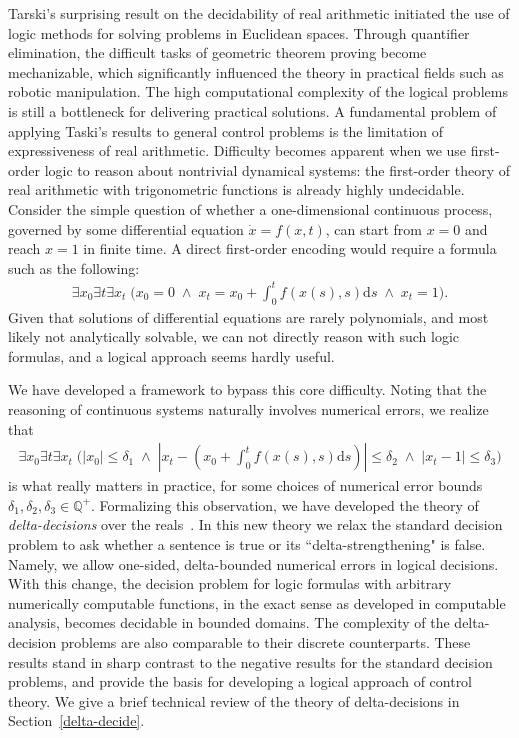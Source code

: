 \documentclass[11pt]{article}
\theoremstyle{definition}
\begin{document}
Tarski's surprising result on the decidability of real arithmetic initiated the use of logic methods for solving problems in Euclidean spaces. Through quantifier elimination, the difficult tasks of geometric theorem proving become mechanizable, which significantly influenced the theory in practical fields such as robotic manipulation. The high computational complexity of the logical problems is still a bottleneck for delivering practical solutions. A fundamental problem of applying Taski's results to general control problems is the limitation of expressiveness of real arithmetic. Difficulty becomes apparent when we use first-order logic to reason about nontrivial dynamical systems: the first-order theory of real arithmetic with trigonometric functions is already highly undecidable. Consider the simple question of whether a one-dimensional continuous process, governed by some differential equation $\dot{x} = f(x,t)$, can start from $x=0$ and reach $x=1$ in finite time. A direct first-order encoding would require a formula such as the following:
\begin{eqnarray*}
\exists x_0 \exists t \exists x_t\; \bigg(x_0 = 0 \;\wedge\; x_t = x_0 + \int_{0}^t f(x(s),s)\mathrm{d}s\; \wedge\; x_t = 1\bigg).
\end{eqnarray*}
Given that solutions of differential equations are rarely polynomials, and most likely not analytically solvable, we can not directly reason with such logic formulas, and a logical approach seems hardly useful. 

We have developed a framework to bypass this core difficulty. Noting that the reasoning of continuous systems naturally involves numerical errors, we realize that
\begin{eqnarray*}
\exists x_0 \exists t \exists x_t\; \bigg(|x_0| \leq \delta_1 \;\wedge\; |x_t - (x_0 + \int_{0}^t f(x(s),s)\mathrm{d}s)| \leq \delta_2\; \wedge\; |x_t - 1|\leq \delta_3\bigg)
\end{eqnarray*}
is what really matters in practice, for some choices of numerical error bounds $\delta_1, \delta_2, \delta_3\in\mathbb{Q}^+$. Formalizing this observation, we have developed the theory of {\em delta-decisions} over the reals~\cite{DBLP:conf/lics/GaoAC12,DBLP:conf/cade/GaoAC12}. In this new theory we relax the standard decision problem to ask whether a sentence is true or its ``delta-strengthening" is false. Namely, we allow one-sided, delta-bounded numerical errors in logical decisions. With this change, the decision problem for logic formulas with arbitrary numerically computable functions, in the exact sense as developed in computable analysis, becomes decidable in bounded domains. The complexity of the delta-decision problems are also comparable to their discrete counterparts. These results stand in sharp contrast to the negative results for the standard decision problems, and provide the basis for developing a logical approach of control theory. We give a brief technical review of the theory of delta-decisions in Section~\ref{delta-decide}. 
\end{document}
